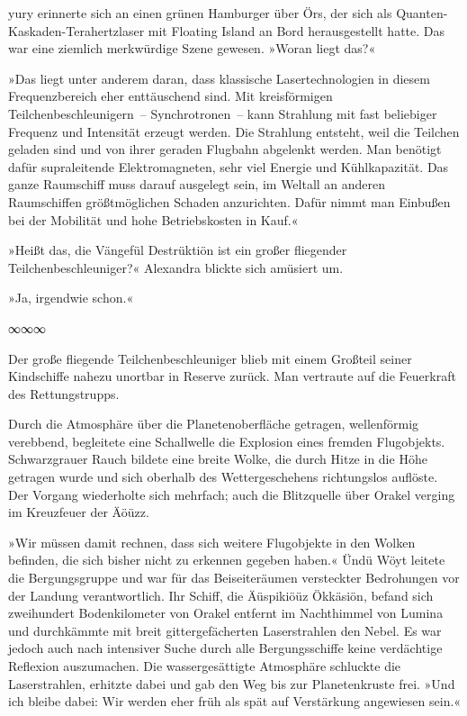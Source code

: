 yury erinnerte sich an einen grünen Hamburger über Örs, der sich als Quanten-Kaskaden-Terahertzlaser mit Floating Island an Bord herausgestellt hatte. Das war eine ziemlich merkwürdige Szene gewesen. »Woran liegt das?«

»Das liegt unter anderem daran, dass klassische Lasertechnologien in diesem Frequenzbereich eher enttäuschend sind. Mit kreisförmigen Teilchenbeschleunigern~– Synchrotronen~– kann Strahlung mit fast beliebiger Frequenz und Intensität erzeugt werden. Die Strahlung entsteht, weil die Teilchen geladen sind und von ihrer geraden Flugbahn abgelenkt werden. Man benötigt dafür supraleitende Elektromagneten, sehr viel Energie und Kühlkapazität. Das ganze Raumschiff muss darauf ausgelegt sein, im Weltall an anderen Raumschiffen größtmöglichen Schaden anzurichten. Dafür nimmt man Einbußen bei der Mobilität und hohe Betriebskosten in Kauf.«

»Heißt das, die Vängefül Destrüktiön ist ein großer fliegender Teilchenbeschleuniger?« Alexandra blickte sich amüsiert um.

»Ja, irgendwie schon.«

\begin{center}
∞∞∞
\end{center}

Der große fliegende Teilchenbeschleuniger blieb mit einem Großteil seiner Kindschiffe nahezu unortbar in Reserve zurück. Man vertraute auf die Feuerkraft des Rettungstrupps.

Durch die Atmosphäre über die Planetenoberfläche getragen, wellenförmig verebbend, begleitete eine Schallwelle die Explosion eines fremden Flugobjekts. Schwarzgrauer Rauch bildete eine breite Wolke, die durch Hitze in die Höhe getragen wurde und sich oberhalb des Wettergeschehens richtungslos auflöste. Der Vorgang wiederholte sich mehrfach; auch die Blitzquelle über Orakel verging im Kreuzfeuer der Äöüzz.

»Wir müssen damit rechnen, dass sich weitere Flugobjekte in den Wolken befinden, die sich bisher nicht zu erkennen gegeben haben.« Ündü Wöyt leitete die Bergungsgruppe und war für das Beiseiteräumen versteckter Bedrohungen vor der Landung verantwortlich. Ihr Schiff, die Äüspikiöüz Ökkäsiön, befand sich zweihundert Bodenkilometer von Orakel entfernt im Nachthimmel von Lumina und durchkämmte mit breit gittergefächerten Laserstrahlen den Nebel. Es war jedoch auch nach intensiver Suche durch alle Bergungsschiffe keine verdächtige Reflexion auszumachen. Die wassergesättigte Atmosphäre schluckte die Laserstrahlen, erhitzte dabei und gab den Weg bis zur Planetenkruste frei. »Und ich bleibe dabei: Wir werden eher früh als spät auf Verstärkung angewiesen sein.«

